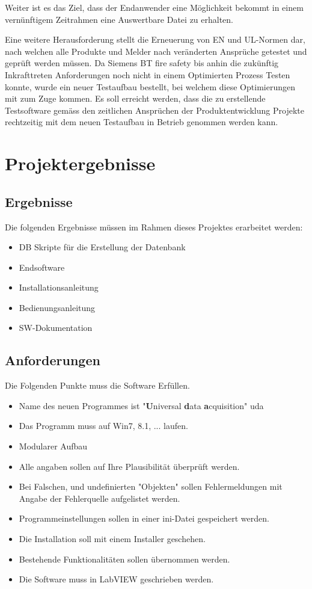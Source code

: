 \documentclass[10pt]{scrartcl}
\begin{document}
Weiter ist es das Ziel, dass der Endanwender eine Möglichkeit bekommt in einem vernünftigem Zeitrahmen eine Auswertbare Datei zu erhalten.

Eine weitere Herausforderung stellt die Erneuerung von EN und UL-Normen dar, nach welchen alle Produkte und Melder nach veränderten Ansprüche getestet und geprüft werden müssen. Da Siemens BT fire safety bis anhin die zukünftig Inkrafttreten Anforderungen noch nicht in einem Optimierten Prozess Testen konnte, wurde ein neuer Testaufbau bestellt, bei welchem diese Optimierungen mit zum Zuge kommen. Es soll erreicht werden, dass die zu erstellende Testsoftware gemäss den zeitlichen Ansprüchen der Produktentwicklung Projekte rechtzeitig mit dem neuen Testaufbau in Betrieb genommen werden kann.
\section{Projektergebnisse}
\subsection{Ergebnisse}
Die folgenden Ergebnisse müssen im Rahmen dieses Projektes erarbeitet werden:
\begin{itemize}
	\item DB Skripte für die Erstellung der Datenbank
	\item Endsoftware
	\item Installationsanleitung
	\item Bedienungsanleitung
	\item SW-Dokumentation
\end{itemize}
\subsection{Anforderungen}
Die Folgenden Punkte muss die Software Erfüllen.
\begin{itemize}
	\item Name des neuen Programmes ist "\textbf{U}niversal \textbf{d}ata \textbf{a}cquisition" \acrshort{uda}
	\item Das Programm muss auf Win7, 8.1, ... laufen.
	\item Modularer Aufbau
	\item Alle angaben sollen auf Ihre Plausibilität überprüft werden.
	\item Bei Falschen, und undefinierten "Objekten" sollen Fehlermeldungen mit Angabe der Fehlerquelle aufgelistet werden.
	\item Programmeinstellungen sollen in einer ini-Datei gespeichert werden.
	\item Die Installation soll mit einem Installer geschehen.
	\item Bestehende Funktionalitäten sollen übernommen werden.
	\item Die Software muss in \gls{LabVIEW} geschrieben werden.
\end{itemize}
\end{document}
